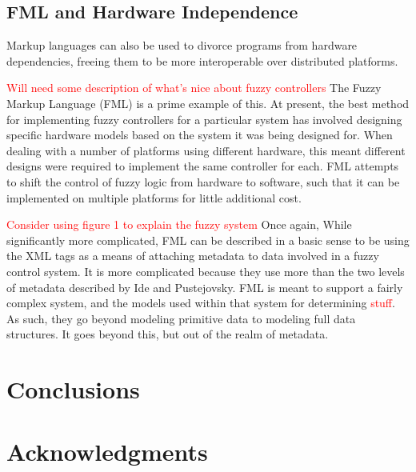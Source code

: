 \documentclass{sig-alternate}
\newcommand{\mycomment}[1]{\textcolor{red}{#1}}
\begin{document}
\subsection*{FML and Hardware Independence}

Markup languages can also be used to divorce programs from hardware dependencies, freeing them to be more interoperable over distributed platforms.

\mycomment{Will need some description of what's nice about fuzzy controllers}
The Fuzzy Markup Language (FML) is a prime example of this. At present, the best method for implementing fuzzy controllers for a particular system has involved designing specific hardware models based on the system it was being designed for. When dealing with a number of platforms using different hardware, this meant different designs were required to implement the same controller for each. FML attempts to shift the control of fuzzy logic from hardware to software, such that it can be implemented on multiple platforms for little additional cost.

\mycomment{Consider using \cite{Acampora:2013} figure 1 to explain the fuzzy system}
Once again, 
While significantly more complicated, FML can be described in a basic sense to be using the XML tags as a means of attaching metadata to data involved in a fuzzy control system. It is more complicated because they use more than the two levels of metadata described by Ide and Pustejovsky. FML is meant to support a fairly complex system, and the models used within that system for determining \textcolor{red}{stuff}. As such, they go beyond modeling primitive data to modeling full data structures. It goes beyond this, but out of the realm of metadata. 

\section{Conclusions}


\section{Acknowledgments}




\end{document}
